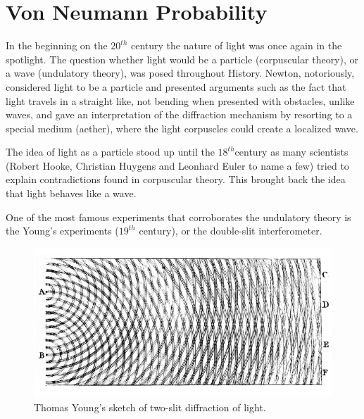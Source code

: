 
\section{Von Neumann Probability}

\label{sec:von_neumann_probability}


 
In the beginning on the $20^{th}$ century the nature of light was once again in the spotlight. The question whether light would be a particle (corpuscular theory), or a wave (undulatory theory), was posed throughout History. Newton, notoriously, considered light to be a particle and presented arguments such as the fact that light travels in a straight like, not bending when presented with obstacles, unlike waves, and gave an interpretation of the diffraction mechanism by resorting to a special medium (aether), where the light corpuscles could create a localized wave\cite{DiasdeDeus:1387968}. 


The idea of light as a particle stood up until the $18^{th}$century as many scientists (Robert Hooke, Christian Huygens and Leonhard Euler to name a few) tried to explain contradictions found in corpuscular theory. This brought back the idea that light behaves like a wave. 

One of the most famous experiments that corroborates the undulatory theory is the Young's experiments ($19^{th}$ century), or the double-slit interferometer.

\begin{figure}[h]
\centering 

\includegraphics[scale=0.25]{Figures/Young_Diffraction.png}

\caption[Caption for LOF]
{Thomas Young's sketch of two-slit diffraction of light.} %

\label{fig:double_slit}
\end{figure}

